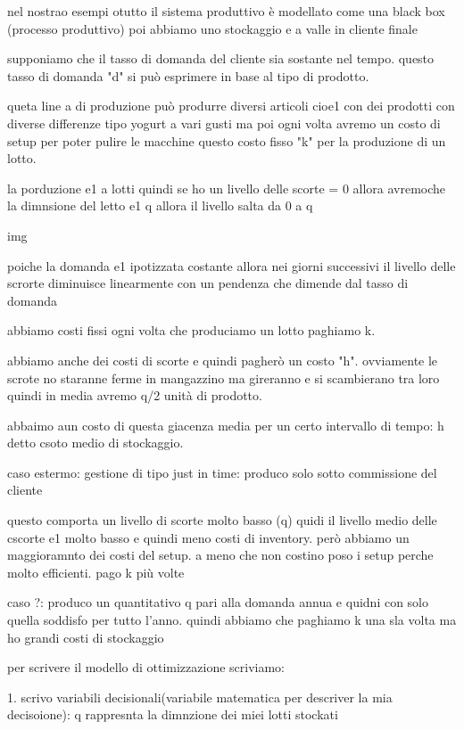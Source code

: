 {nel nostrao esempi otutto il sistema produttivo è modellato come una black box (processo produttivo) poi abbiamo uno stockaggio e a valle in cliente finale

supponiamo che il tasso di domanda del cliente sia sostante nel tempo. questo tasso di domanda "d" si può esprimere in base al tipo di prodotto.

queta line a di produzione può produrre diversi articoli cioe1 con dei prodotti con diverse differenze tipo yogurt a vari gusti ma poi ogni volta avremo un costo di setup per poter pulire le macchine questo costo fisso "k" per la produzione di un lotto.

la porduzione e1 a lotti quindi se ho un livello delle scorte = 0 allora avremoche la dimnsione del letto e1 q allora il livello salta da 0 a q 


img 


poiche la domanda e1 ipotizzata costante allora nei giorni successivi il livello delle scrorte diminuisce linearmente con un pendenza che dimende dal tasso di domanda


abbiamo costi fissi ogni volta che produciamo un lotto paghiamo k.

abbiamo anche dei costi di scorte e quindi pagherò un costo "h". ovviamente le scrote no staranne ferme in mangazzino ma gireranno e si scambierano tra loro quindi in media avremo q/2 unità di prodotto.

abbaimo aun costo di questa giacenza media per un certo intervallo di tempo: h detto csoto medio di stockaggio.



caso estermo: gestione di tipo just in time: produco solo sotto commissione del cliente

questo comporta un livello di scorte molto basso (q) quidi il livello medio delle cscorte e1 molto basso e quindi meno costi di inventory. però abbiamo un maggioramnto dei costi del setup. a meno che non costino poso i setup perche molto efficienti. pago k più volte


caso ?: produco un quantitativo q pari alla domanda annua e quidni con solo quella soddisfo per tutto l'anno. quindi abbiamo che paghiamo k una sla volta ma ho grandi costi di stockaggio



per scrivere il modello di ottimizzazione scriviamo:

1. scrivo variabili decisionali(variabile matematica per descriver la mia decisoione): q rappresnta la dimnzione dei miei lotti stockati

}
